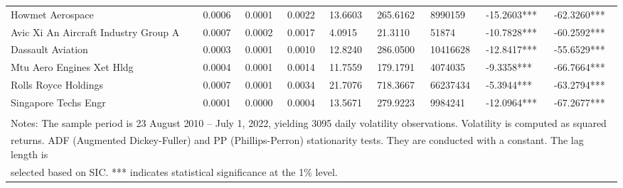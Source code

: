 \documentclass[
  letterpaper,
  DIV=11,
  numbers=noendperiod]{scrartcl}
\begin{document}
\begin{table}[H]
{\begin{tabular}[t]{lllllllll}
\addlinespace
Howmet Aerospace & 0.0006 & 0.0001 & 0.0022 & 13.6603 & 265.6162 & 8990159 & -15.2603*** & -62.3260***\\
Avic Xi An Aircraft Industry Group  A & 0.0007 & 0.0002 & 0.0017 & 4.0915 & 21.3110 & 51874 & -10.7828*** & -60.2592***\\
Dassault Aviation & 0.0003 & 0.0001 & 0.0010 & 12.8240 & 286.0500 & 10416628 & -12.8417*** & -55.6529***\\
Mtu Aero Engines  Xet  Hldg & 0.0004 & 0.0001 & 0.0014 & 11.7559 & 179.1791 & 4074035 & -9.3358*** & -66.7664***\\
Rolls Royce Holdings & 0.0007 & 0.0001 & 0.0034 & 21.7076 & 718.3667 & 66237434 & -5.3944*** & -63.2794***\\
\addlinespace
Singapore Techs Engr & 0.0001 & 0.0000 & 0.0004 & 13.5671 & 279.9223 & 9984241 & -12.0964*** & -67.2677***\\
\bottomrule
\multicolumn{9}{l}{\textsuperscript{} Notes: The sample period is 23 August 2010 – July 1, 2022, yielding 3095 daily volatility observations. Volatility is computed as squared}\\
\multicolumn{9}{l}{returns. ADF (Augmented Dickey-Fuller) and PP (Phillips-Perron) stationarity tests. They are conducted with a constant. The lag length is}\\
\multicolumn{9}{l}{selected based on SIC. *** indicates statistical significance at the 1\% level.}\\
\end{tabular}}
\end{table}

\newpage{}
\end{document}
